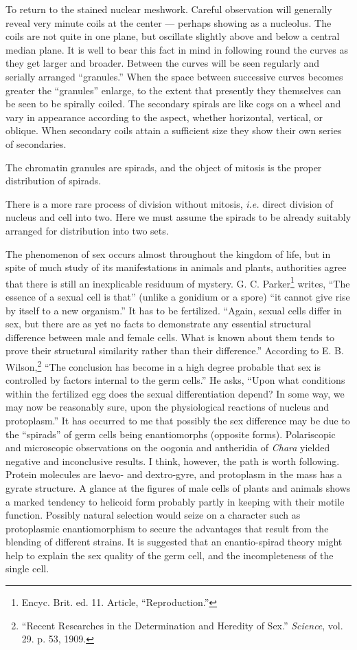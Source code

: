 \documentclass[a4paper, 12pt, oneside]{article}
\begin{document}
To return to the stained nuclear meshwork. Careful observation will generally reveal very minute coils at the center --- perhaps showing as a nucleolus. The coils are not quite in one plane, but oscillate slightly above and below a central median plane. It is well to bear this fact in mind in following round the curves as they get larger and broader. Between the curves will be seen regularly and serially arranged ``granules.'' When the space between successive curves becomes greater the ``granules'' enlarge, to the extent that presently they themselves can be seen to be spirally coiled. The secondary spirals are like cogs on a wheel and vary in appearance according to the aspect, whether horizontal, vertical, or oblique. When secondary coils attain a sufficient size they show their own series of secondaries.

The chromatin granules are spirads, and the object of mitosis is the proper distribution of spirads.

There is a more rare process of division without mitosis, \emph{i.e.} direct division of nucleus and cell into two. Here we must assume the spirads to be already suitably arranged for distribution into two sets.

The phenomenon of sex occurs almost throughout the kingdom of life, but in spite of much study of its manifestations in animals and plants, authorities agree that there is still an inexplicable residuum of mystery. G. C. Parker\footnote{Encyc. Brit. ed. 11. Article, ``Reproduction.''} writes, ``The essence of a sexual cell is that'' (unlike a gonidium or a spore) ``it cannot give rise by itself to a new organism.'' It has to be fertilized. ``Again, sexual cells differ in sex, but there are as yet no facts to demonstrate any essential structural difference between male and female cells. What is known about them tends to prove their structural similarity rather than their difference.'' According to E. B. Wilson,\footnote{``Recent Researches in the Determination and Heredity of Sex.'' \emph{Science}, vol. 29. p. 53, 1909.} ``The conclusion has become in a high degree probable that sex is controlled by factors internal to the germ cells.'' He asks, ``Upon what conditions within the fertilized egg does the sexual differentiation depend? In some way, we may now be reasonably sure, upon the physiological reactions of nucleus and protoplasm.'' It has occurred to me that possibly the sex difference may be due to the ``spirads'' of germ cells being enantiomorphs (opposite forms). Polariscopic and microscopic observations on the oogonia and antheridia of \emph{Chara} yielded negative and inconclusive results. I think, however, the path is worth following. Protein molecules are laevo- and dextro-gyre, and protoplasm in the mass has a gyrate structure. A glance at the figures of male cells of plants and animals shows a marked tendency to helicoid form probably partly in keeping with their motile function. Possibly natural selection would seize on a character such as protoplasmic enantiomorphism to secure the advantages that result from the blending of different strains. It is suggested that an enantio-spirad theory might help to explain the sex quality of the germ cell, and the incompleteness of the single cell.
\end{document}
